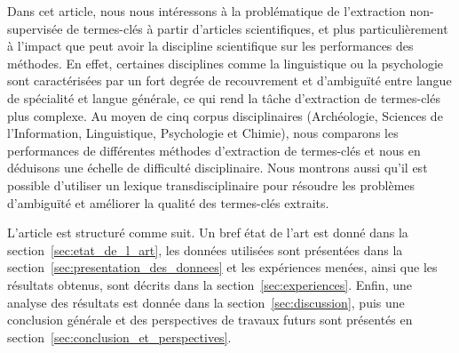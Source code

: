   Dans cet article, nous nous intéressons à la problématique de l'extraction non-supervisée de termes-clés à partir d'articles scientifiques, et plus particulièrement à l'impact que peut avoir la discipline scientifique sur les performances des méthodes.
  En effet, certaines disciplines comme la linguistique ou la psychologie sont caractérisées par un fort degrée de recouvrement et d'ambiguïté entre langue de spécialité et langue générale, ce qui rend la tâche d'extraction de termes-clés plus complexe.
  Au moyen de cinq corpus disciplinaires (Archéologie, Sciences de
  l'Information, Linguistique, Psychologie et Chimie), nous comparons les
  performances de différentes méthodes d'extraction de termes-clés et nous en
  déduisons une échelle de difficulté disciplinaire.
  Nous montrons aussi qu'il est possible d'utiliser un lexique
  transdisciplinaire pour résoudre les problèmes d'ambiguïté et améliorer la
  qualité des termes-clés extraits.


  L'article est structuré comme suit. Un bref état de l'art est donné dans la
  section~\ref{sec:etat_de_l_art}, les données utilisées sont présentées dans la
  section~\ref{sec:presentation_des_donnees} et les expériences menées, ainsi
  que les résultats obtenus, sont décrits dans la section~\ref{sec:experiences}.
  Enfin, une analyse des résultats est donnée dans la
  section~\ref{sec:discussion}, puis une conclusion générale et des perspectives
  de travaux futurs sont présentés en
  section~\ref{sec:conclusion_et_perspectives}.


